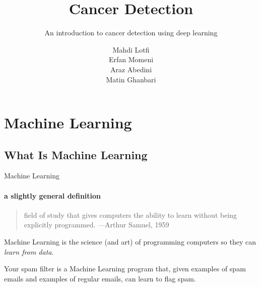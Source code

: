 \documentclass{beamer}
\title{Cancer Detection} %
\subtitle{An introduction to cancer detection using deep learning} %
\author{Mahdi Lotfi \\ Erfan Momeni \\ Araz Abedini \\ Matin Ghanbari}
\begin{document}
  \frame[c]{\maketitle}

    \section{Machine Learning}
    \subsection{What Is Machine Learning}
    \begin{frame}[t]{Machine Learning}
      \framesubtitle{a slightly general definition}%
      \begin{quote}
        field of study that gives computers the ability to learn without being explicitly programmed.
        \hfill {\tiny —Arthur Samuel, 1959}
      \end{quote}
      Machine Learning is the science (and art) of programming computers so they can \textit{learn from data}. \\
      \vspace{8mm}
      \parbox{0.55\textwidth}{
      Your spam filter is a Machine Learning program that, given examples of spam emails and examples of regular emails, can learn to flag spam.
      }
    \end{frame}
\end{document}
